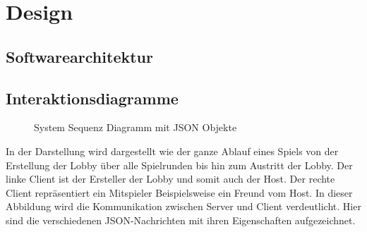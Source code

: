 \documentclass[11pt,ngerman]{article}
\begin{document}


    \section{Design}

    \subsection{Softwarearchitektur}
	
    \subsection{Interaktionsdiagramme}
    \begin{figure}[H]
    	\centering
    	\caption{System Sequenz Diagramm mit JSON Objekte}
    	\label{fig:Game_SSD_with_JSON}
    \end{figure}
	In der Darstellung wird dargestellt wie der ganze Ablauf eines Spiels von der Erstellung der Lobby über alle Spielrunden bis hin zum Austritt der Lobby. Der linke Client ist der Ersteller der Lobby und somit auch der Host. Der rechte Client repräsentiert ein Mitspieler Beispielsweise ein Freund vom Host. In dieser Abbildung wird die Kommunikation zwischen Server und Client verdeutlicht. Hier sind die verschiedenen JSON-Nachrichten mit ihren Eigenschaften aufgezeichnet.
\end{document}
